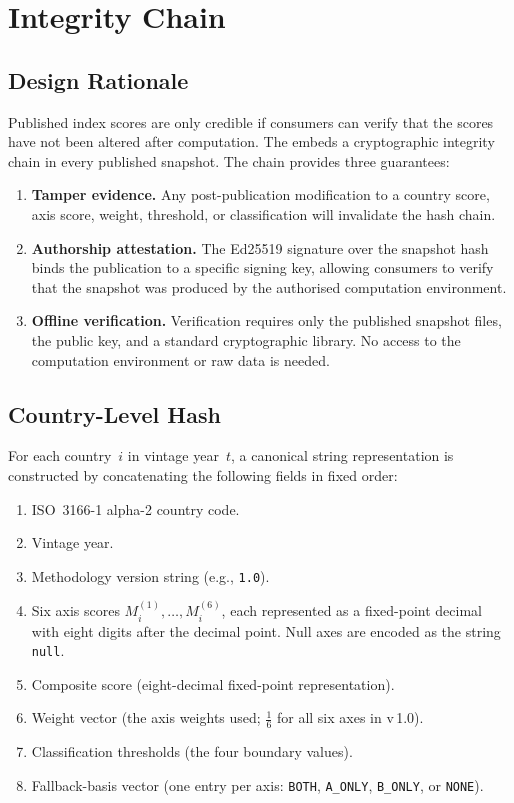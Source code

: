 \section{Integrity Chain}\label{sec:integrity-chain}

\subsection{Design Rationale}\label{sec:integrity:rationale}

Published index scores are only credible if consumers can verify that the
scores have not been altered after computation.  The \ISI embeds a
cryptographic integrity chain in every published snapshot.  The chain provides
three guarantees:

\begin{enumerate}
  \item \textbf{Tamper evidence.}  Any post-publication modification to a
    country score, axis score, weight, threshold, or classification will
    invalidate the hash chain.
  \item \textbf{Authorship attestation.}  The Ed25519 signature over the
    snapshot hash binds the publication to a specific signing key, allowing
    consumers to verify that the snapshot was produced by the authorised
    computation environment.
  \item \textbf{Offline verification.}  Verification requires only the
    published snapshot files, the public key, and a standard cryptographic
    library.  No access to the computation environment or raw data is needed.
\end{enumerate}

\subsection{Country-Level Hash}\label{sec:integrity:country}

For each country~\(i\) in vintage year~\(t\), a canonical string
representation is constructed by concatenating the following fields in
fixed order:

\begin{enumerate}
  \item ISO~3166-1 alpha-2 country code.
  \item Vintage year.
  \item Methodology version string (e.g., \texttt{1.0}).
  \item Six axis scores \(M_i^{(1)}, \ldots, M_i^{(6)}\), each represented
    as a fixed-point decimal with eight digits after the decimal point.
    Null axes are encoded as the string \texttt{null}.
  \item Composite score (eight-decimal fixed-point representation).
  \item Weight vector (the axis weights used; \(\tfrac{1}{6}\) for all six
    axes in v\,1.0).
  \item Classification thresholds (the four boundary values).
  \item Fallback-basis vector (one entry per axis: \texttt{BOTH},
    \texttt{A\_ONLY}, \texttt{B\_ONLY}, or \texttt{NONE}).
\end{enumerate}

